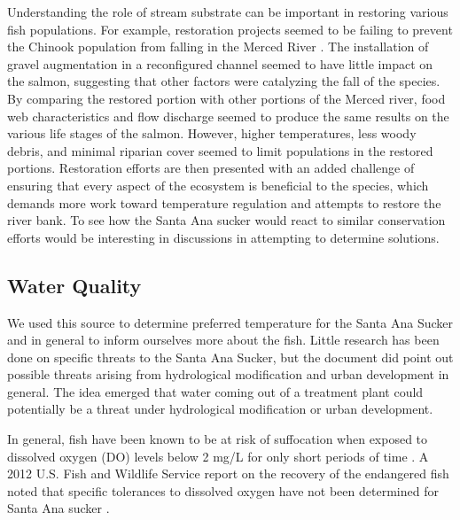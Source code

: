 \documentclass{article}\usepackage[]{graphicx}\usepackage[]{color}
\begin{document}
Understanding the role of stream substrate can be important in restoring various fish populations. For example, restoration projects seemed to be failing to prevent the Chinook population from falling in the Merced River \citep{albertson13}. The installation of gravel augmentation in a reconfigured channel seemed to have little impact on the salmon, suggesting that other factors were catalyzing the fall of the species. By comparing the restored portion with other portions of the Merced river, food web characteristics and flow discharge seemed to produce the same results on the various life stages of the salmon. However, higher temperatures, less woody debris, and minimal riparian cover seemed to limit populations in the restored portions. Restoration efforts are then presented with an added challenge of ensuring that every aspect of the ecosystem is beneficial to the species, which demands more work toward temperature regulation and attempts to restore the river bank. To see how the Santa Ana sucker would react to similar conservation efforts would be interesting in discussions in attempting to determine solutions.

\subsection{Water Quality}

We used this source to determine preferred temperature for the Santa Ana Sucker and in general to inform ourselves more about the fish. Little research has been done on specific threats to the Santa Ana Sucker, but the document did point out possible threats arising from hydrological modification and urban development in general. The idea emerged that water coming out of a treatment plant could potentially be a threat under hydrological modification or urban development.

In general, fish have been known to be at risk of suffocation when exposed to dissolved oxygen (DO) levels below 2 mg/L for only short periods of time \citep{REF}. A 2012 U.S. Fish and Wildlife Service report on the recovery of the endangered fish noted that specific tolerances to dissolved oxygen have not been determined for  Santa Ana sucker \citep{evans2005draft}.
\end{document}
